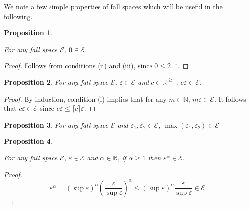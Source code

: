 \documentclass{article}
\theoremstyle{definition}
\theoremstyle{plain}
\newtheorem{proposition}{Proposition}[section]
\newcommand{\Nats}{\mathbb{N}}
\newcommand{\Reals}{\mathbb{R}}
\newcommand{\Ceil}[1]{\lceil #1 \rceil}
\begin{document}
We note a few simple properties of fall spaces which will be useful in the following.

\begin{proposition}
\label{prp:err_spc_zero}

For any fall space $\mathcal{E}$, $0 \in \mathcal{E}$.

\end{proposition}

\begin{proof}

Follows from conditions (ii) and (iii), since $0 \leq 2^{-h}$.

\end{proof}

\begin{proposition}

For any fall space $\mathcal{E}$, $\varepsilon \in \mathcal{E}$ and $c \in \Reals^{\geq 0}$, $c \varepsilon \in \mathcal{E}$.

\end{proposition}

\begin{proof}

By induction, condition (i) implies that for any $m \in \Nats$, $m\varepsilon \in \mathcal{E}$. It follows that $c\varepsilon \in \mathcal{E}$ since $c\varepsilon \leq \Ceil{c}\varepsilon$.

\end{proof}

\begin{proposition}

For any fall space $\mathcal{E}$ and $\varepsilon_1, \varepsilon_2 \in \mathcal{E}$, $\max(\varepsilon_1,\varepsilon_2) \in \mathcal{E}$

\end{proposition}


\begin{proposition}
\label{prp:fall_space_closed_wrt_power}

For any fall space $\mathcal{E}$, $\varepsilon \in \mathcal{E}$ and $\alpha \in \Reals$, if $\alpha \geq 1$ then $\varepsilon^\alpha \in \mathcal{E}$.

\end{proposition}

\begin{proof}

$$\varepsilon^\alpha = (\sup \varepsilon)^\alpha (\frac{\varepsilon}{\sup \varepsilon})^\alpha \leq  (\sup \varepsilon)^\alpha \frac{\varepsilon}{\sup \varepsilon} \in \mathcal{E}$$

\end{proof}
\end{document}
